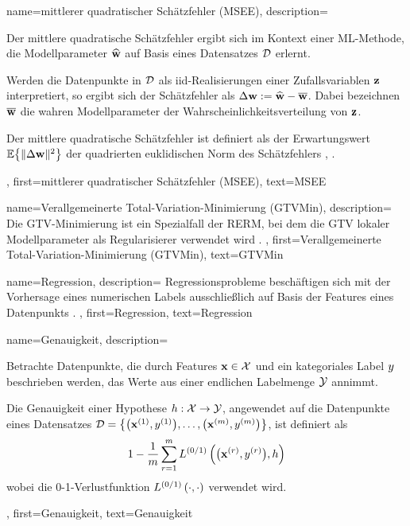 {{{{
{
	name={mittlerer quadratischer Schätzfehler (MSEE)},
	description={
		Der mittlere quadratische Schätzfehler ergibt sich im Kontext einer \gls{ML}-Methode, 
		die \gls{Modellparameter} $\widehat{{\bf w}}$ auf Basis eines \gls{Datensatzes} $\mathcal{D}$ erlernt. 
		
		Werden die \gls{Datenpunkte} in $\mathcal{D}$ als \gls{iid}-\gls{Realisierungen} einer \gls{Zufallsvariablen} ${\bf z}$ interpretiert, 
		so ergibt sich der \gls{Schätzfehler} als $\Delta {\bf w} := \widehat{{\bf w}} - \overline{{\bf w}}$. 
		Dabei bezeichnen $\overline{{\bf w}}$ die wahren \gls{Modellparameter} der \gls{Wahrscheinlichkeitsverteilung} von ${\bf z}$. 
		
		Der mittlere quadratische \gls{Schätzfehler} ist definiert als der Erwartungswert $\mathbb{E} \big\{ \| \Delta {\bf w} \|^{2} \big\}$ 
		der quadrierten euklidischen \gls{Norm} des Schätzfehlers \cite{LC}, \cite{kay}.
	},
	first={mittlerer quadratischer Schätzfehler (MSEE)},
	text={MSEE}
}

{
	name={Verallgemeinerte Total-Variation-Minimierung (GTVMin)},
	description={
		Die \gls{GTV}-Minimierung ist ein Spezialfall der \gls{RERM}, 
		bei dem die \gls{GTV} lokaler \gls{Modellparameter} als \gls{Regularisierer} verwendet wird \cite{ClusteredFLTVMinTSP}.
	},
	first={Verallgemeinerte Total-Variation-Minimierung (GTVMin)},
	text={GTVMin}
}

{
	name={Regression},
	description={
		Regressionsprobleme beschäftigen sich mit der Vorhersage eines numerischen \gls{Labels} 
		ausschließlich auf Basis der \gls{Features} eines \gls{Datenpunkts} \cite[Kap.~2]{MLBasics}.
	},
	first={Regression},
	text={Regression}
}
{
	name={Genauigkeit},
	description={
		Betrachte \gls{Datenpunkte}, die durch \gls{Features} ${\bf x} \in \mathcal{X}$ 
		und ein kategoriales \gls{Label} $y$ beschrieben werden, das Werte aus einer endlichen 
		\gls{Labelmenge} $\mathcal{Y}$ annimmt. 
		
		Die Genauigkeit einer \gls{Hypothese} $h: \mathcal{X} \rightarrow \mathcal{Y}$, 
		angewendet auf die \gls{Datenpunkte} eines \gls{Datensatzes} 
		$\mathcal{D} = \big\{ \big({\bf x}^{(1)}, y^{(1)} \big), \ldots, \big({\bf x}^{(m)},y^{(m)}\big) \big\}$, 
		ist definiert als
		\[
		1 - \frac{1}{m} \sum_{r=1}^{m} 
		L^{(0/1)}\left(\big({\bf x}^{(r)},y^{(r)}\big),h \right)
		\]
		wobei die \gls{0-1-Verlustfunktion} $L^{(0/1)}\left(\cdot,\cdot \right)$ verwendet wird.
	},
	first={Genauigkeit},
	text={Genauigkeit}
}

}}}}
